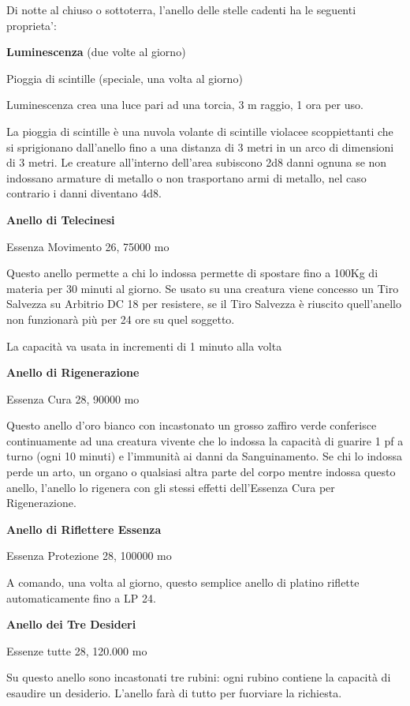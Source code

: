 \documentclass[a4paper,11pt,twoside,openany]{book}
\begin{document}
Di notte al chiuso o sottoterra, l'anello delle stelle cadenti ha le seguenti proprieta':

\textbf{Luminescenza} (due volte al giorno)

Pioggia di scintille (speciale, una volta al giorno)

Luminescenza crea una luce pari ad una torcia, 3 m raggio, 1 ora per
uso.

La pioggia di scintille è una nuvola volante di scintille violacee scoppiettanti che si sprigionano dall'anello fino a una distanza di 3 metri in un arco di dimensioni di 3 metri. Le creature all'interno dell'area subiscono 2d8 danni ognuna se non indossano armature di metallo o non trasportano armi di metallo, nel caso contrario i danni diventano 4d8.

\textbf{Anello di Telecinesi}

Essenza Movimento 26, 75000 mo

Questo anello permette a chi lo indossa permette di spostare fino a 100Kg di materia per 30 minuti al giorno. Se usato su una creatura viene concesso un Tiro Salvezza su Arbitrio DC 18 per resistere, se il Tiro Salvezza è riuscito quell'anello non funzionarà più per 24 ore su quel soggetto.

La capacità va usata in incrementi di 1 minuto alla volta

\textbf{Anello di Rigenerazione}

Essenza Cura 28, 90000 mo

Questo anello d'oro bianco con incastonato un grosso zaffiro verde conferisce continuamente ad una creatura vivente che lo indossa la capacità di guarire 1 pf a turno (ogni 10 minuti) e l'immunità ai danni da Sanguinamento. Se chi lo indossa perde un arto, un organo o qualsiasi altra parte del corpo mentre indossa questo anello, l'anello lo rigenera con gli stessi effetti dell'Essenza Cura per Rigenerazione.

\textbf{Anello di Riflettere Essenza}

Essenza Protezione 28, 100000 mo

A comando, una volta al giorno, questo semplice anello di platino riflette automaticamente fino a LP 24.

\textbf{Anello dei Tre Desideri}

Essenze tutte 28, 120.000 mo

Su questo anello sono incastonati tre rubini: ogni rubino contiene la capacità di esaudire un desiderio. L'anello farà di tutto per fuorviare la richiesta.
\end{document}
